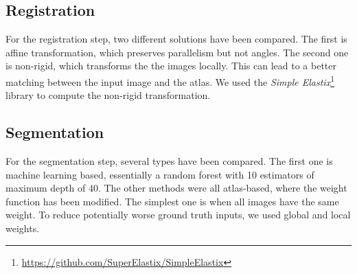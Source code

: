 \subsection*{Registration}
For the registration step, two different solutions have been compared. The first is affine transformation, which preserves parallelism but not angles. The second one is non-rigid, which transforms the the images locally. This can lead to a better matching between the input image and the atlas. We used the \textit{Simple Elastix}\footnote{\url{https://github.com/SuperElastix/SimpleElastix}} library to compute the non-rigid transformation.

\subsection*{Segmentation}
For the segmentation step, several types have been compared. The first one is machine learning based, essentially a random forest with 10 estimators of maximum depth of 40. The other methods were all atlas-based, where the weight function has been modified. The simplest one is when all images have the same weight. To reduce potentially worse ground truth inputs, we used global and local weights.
